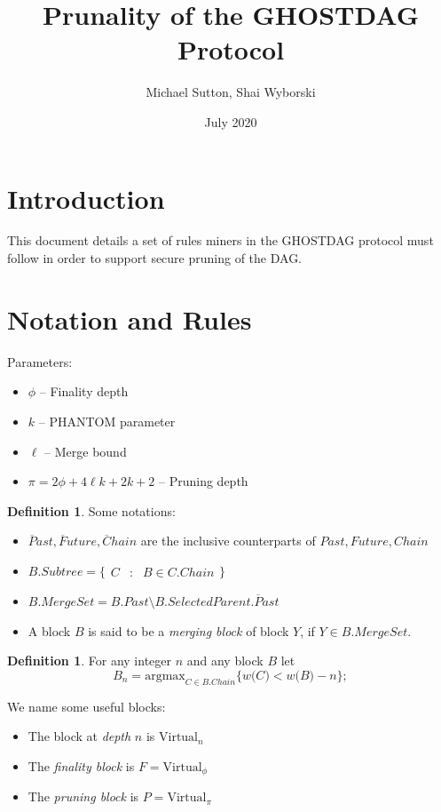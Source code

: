 \documentclass{article}
\title{Prunality of the GHOSTDAG Protocol}
\author{Michael Sutton, Shai Wyborski}
\date{July 2020}
\theoremstyle{plain}
\theoremstyle{definition}
\newtheorem{definition}[]{Definition}
\theoremstyle{remark}
\newcommand{\score}[1]{{w\bigl(#1\bigr)}}
\newcommand{\argmax}[2]{\mbox{argmax}_{#1}\{#2\}}
\newcommand{\virt}{\mbox{Virtual}}
\newcommand{\comma}[2]{
    \begin{aligned}#1 & : & #2\end{aligned}
}
\begin{document}
\maketitle

\section{Introduction}

This document details a set of rules miners in the GHOSTDAG \cite{sompolinsky2018phantom} protocol must follow in order to support secure pruning of the DAG.

\section{Notation and Rules}

Parameters:
\begin{itemize}
    \item $\phi$ -- Finality depth
    \item $k$ -- PHANTOM parameter
    \item $\ell$ -- Merge bound
    \item $\pi = 2\phi + 4 \ell k + 2k + 2$ -- Pruning depth
\end{itemize}

\begin{definition}
    Some notations:
    \begin{itemize}
        \item $\overline{P}ast, \overline{F}uture, \overline{C}hain$ are the inclusive counterparts of $Past, Future, Chain$
        \item $B.Subtree = \{ \comma{C}{B \in C.Chain} \}$
        \item $B.MergeSet = B.Past \setminus B.SelectedParent.\overline{P}ast$  
        \item A block $B$ is said to be a \emph{merging block} of block $Y$, if $Y \in B.MergeSet$.
    \end{itemize}
\end{definition}

\begin{definition} \label{def:blue_depth}
    For any integer $n$ and any block $B$ let $$B_n = \argmax{C\in B.Chain}{\score{C} < \score{B} - n};$$ 
    
    We name some useful blocks:
    \begin{itemize}
        \item The block at \emph{depth} $n$  is $\virt_n$
        \item The \emph{finality block} is $F = \virt_\phi$
        \item The \emph{pruning block} is $P = \virt_\pi$
    \end{itemize}
\end{definition}
\end{document}
